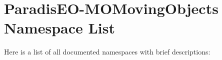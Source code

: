 \section{ParadisEO-MOMovingObjects Namespace List}
Here is a list of all documented namespaces with brief descriptions:\begin{CompactList}
\item{}
\end{CompactList}
